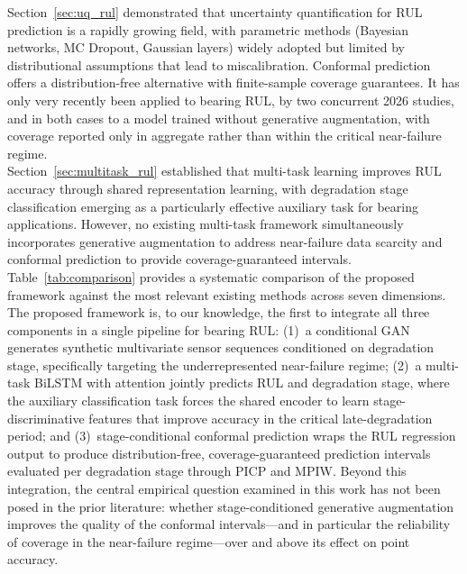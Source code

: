 Section~\ref{sec:uq_rul} demonstrated that uncertainty quantification
for RUL prediction is a rapidly growing field, with parametric methods
(Bayesian networks, MC Dropout, Gaussian layers) widely adopted but
limited by distributional assumptions that lead to miscalibration.
Conformal prediction offers a distribution-free alternative with
finite-sample coverage guarantees. It has only very recently been
applied to bearing RUL, by two concurrent 2026 studies, and in both
cases to a model trained without generative augmentation, with coverage
reported only in aggregate rather than within the critical near-failure
regime.\\

Section~\ref{sec:multitask_rul} established that multi-task learning
improves RUL accuracy through shared representation learning,
with degradation stage classification emerging as a particularly
effective auxiliary task for bearing applications. However, no
existing multi-task framework simultaneously incorporates generative
augmentation to address near-failure data scarcity and conformal
prediction to provide coverage-guaranteed intervals.\\

Table~\ref{tab:comparison} provides a systematic comparison of the
proposed framework against the most relevant existing methods across
seven dimensions. The proposed framework is, to our knowledge, the
first to integrate all three components in a single pipeline for
bearing RUL: (1)~a conditional GAN generates synthetic multivariate
sensor sequences conditioned on degradation stage, specifically
targeting the underrepresented near-failure regime; (2)~a multi-task
BiLSTM with attention jointly predicts RUL and degradation stage,
where the auxiliary classification task forces the shared encoder to
learn stage-discriminative features that improve accuracy in the
critical late-degradation period; and (3)~stage-conditional conformal
prediction wraps the RUL regression output to produce distribution-free,
coverage-guaranteed prediction intervals evaluated per degradation
stage through PICP and MPIW. Beyond this integration, the central
empirical question examined in this work has not been posed in the
prior literature: whether stage-conditioned generative augmentation
improves the quality of the conformal intervals---and in particular the
reliability of coverage in the near-failure regime---over and above its
effect on point accuracy.



